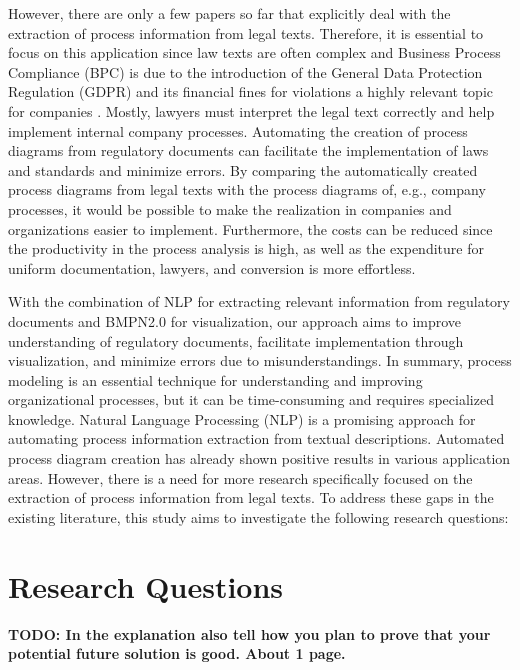 However, there are only a few papers so far that explicitly deal with the extraction of process information from legal texts. Therefore, it is essential to focus on this application since law texts are often complex and Business Process Compliance (BPC) is due to the introduction of the General Data Protection Regulation (GDPR) and its financial fines for violations a highly relevant topic for companies \cite{sunDesigntimeBusinessProcess2023}.  Mostly, lawyers must interpret the legal text correctly and help implement internal company processes. Automating the creation of process diagrams from regulatory documents can facilitate the implementation of laws and standards and minimize errors. By comparing the automatically created process diagrams from legal texts with the process diagrams of, e.g., company processes, it would be possible to make the realization in companies and organizations easier to implement. Furthermore, the costs can be reduced since the productivity in the process analysis is high, as well as the expenditure for uniform documentation, lawyers, and conversion is more effortless.

With the combination of NLP for extracting relevant information from regulatory documents and BMPN2.0 for visualization, our approach aims to improve understanding of regulatory documents, facilitate implementation through visualization, and minimize errors due to misunderstandings. 
In summary, process modeling is an essential technique for understanding and improving organizational processes, but it can be time-consuming and requires specialized knowledge. Natural Language Processing (NLP) is a promising approach for automating process information extraction from textual descriptions. Automated process diagram creation has already shown positive results in various application areas. However, there is a need for more research specifically focused on the extraction of process information from legal texts. To address these gaps in the existing literature, this study aims to investigate the following research questions:
\pagebreak

\section{Research Questions}
\label{sec:intro:rq}
 \textbf{TODO: In the explanation also tell how you plan to prove that your potential future solution is good. About 1 page.}
 
